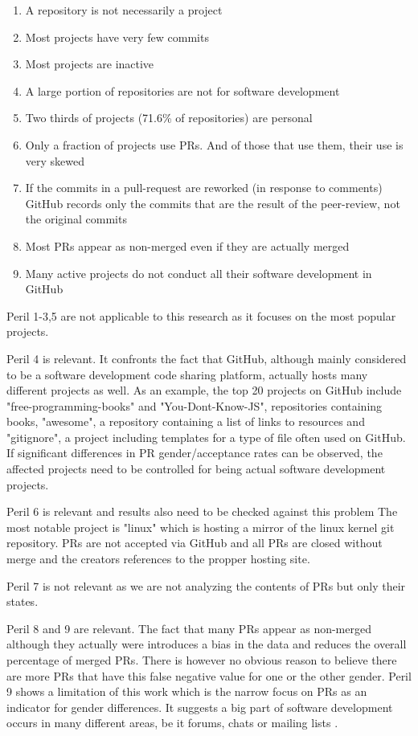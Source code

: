 \begin{enumerate}
	\item  A repository is not necessarily a project
	\item  Most projects have very few commits
	\item  Most projects are inactive
	\item  A large portion of repositories are not for software development
	\item  Two thirds of projects (71.6\% of repositories) are personal
	\item  Only a fraction of projects use \ac{PR}s. And of those that use them, their use is very skewed
	\item  If the commits in a pull-request are reworked (in response to comments) GitHub records only the commits that are the result of the peer-review, not the original commits
	\item  Most \ac{PR}s appear as non-merged even if they are actually merged
	\item  Many active projects do not conduct all their software development in GitHub
\end{enumerate}

Peril 1-3,5 are not applicable to this research as it focuses on the most popular projects.

Peril 4 is relevant. It confronts the fact that GitHub, although mainly considered to be a software development code sharing platform, actually hosts many different projects as well. As an example, the top 20 projects on GitHub include "free-programming-books" and "You-Dont-Know-JS", repositories containing books, "awesome", a repository containing a list of links to resources and "gitignore", a project including templates for a type of file often used on GitHub. If significant differences in \ac{PR} gender/acceptance rates can be observed, the affected projects need to be controlled for being actual software development projects.

Peril 6 is relevant and results also need to be checked against this problem The most notable project is "linux" which is hosting a mirror of the linux kernel git repository. \ac{PR}s are not accepted via GitHub and all \ac{PR}s are closed without merge and the creators references to the propper hosting site.

Peril 7 is not relevant as we are not analyzing the contents of \ac{PR}s but only their states.

Peril 8 and 9 are relevant. The fact that many \ac{PR}s appear as non-merged although they actually were introduces a bias in the data and reduces the overall percentage of merged \ac{PR}s. There is however no obvious reason to believe there are more \ac{PR}s that have this false negative value for one or the other gender. Peril 9 shows a limitation of this work which is the narrow focus on \ac{PR}s as an indicator for gender differences. It suggests a big part of software development occurs in many different areas, be it forums, chats or mailing lists \cite{perils-github:2015}.

